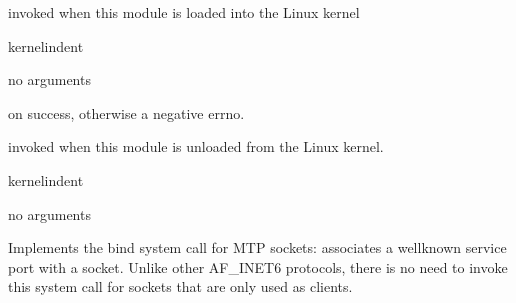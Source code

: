 \documentclass[letterpaper,10pt,english]{sphinxmanual}
\begin{document}
\sphinxstepscope
{}

\begin{fulllineitems}
\label{\detokenize{mtpimpl.c:c.MTP_load}}
\pysigstartsignatures
\pysigstartmultiline
{}
\pysigstopmultiline
\pysigstopsignatures
\sphinxAtStartPar
invoked when this module is loaded into the Linux kernel

\end{fulllineitems}


\begin{sphinxuseclass}{kernelindent}
\sphinxAtStartPar
{}
\begin{description}
\sphinxAtStartPar
no arguments

\end{description}

\sphinxAtStartPar
{}

 on success, otherwise a negative errno.

\end{sphinxuseclass}

\begin{fulllineitems}

\pysigstartsignatures
{}
\pysigstopsignatures
\sphinxAtStartPar
invoked when this module is unloaded from the Linux kernel.

\end{fulllineitems}


\begin{sphinxuseclass}{kernelindent}
\sphinxAtStartPar
{}
\begin{description}
\sphinxAtStartPar
no arguments

\end{description}

\end{sphinxuseclass}

\begin{fulllineitems}
\label{\detokenize{mtpimpl.c:c.MTP_bind}}
\pysigstartsignatures
\pysigstartmultiline
{}
\pysigstopmultiline
\pysigstopsignatures
\sphinxAtStartPar
Implements the bind system call for MTP sockets: associates a well\sphinxhyphen{}known service port with a socket. Unlike other AF\_INET6 protocols, there is no need to invoke this system call for sockets that are only used as clients.

\end{fulllineitems}
\end{document}
